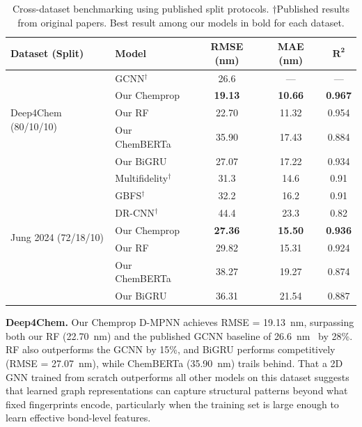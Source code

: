 \documentclass[journal=jcisd8,manuscript=article]{achemso}
\begin{document}
\begin{table}[htbp]
\centering
\caption{Cross-dataset benchmarking using published split protocols. $\dagger$Published results from original papers. Best result among our models in bold for each dataset.}
\label{tab:cross_dataset}
\begin{tabular}{llccc}
\toprule
\textbf{Dataset (Split)} & \textbf{Model} & \textbf{RMSE (nm)} & \textbf{MAE (nm)} & $\boldsymbol{R^2}$ \\
\midrule
\multirow{5}{*}{Deep4Chem (80/10/10)}
  & GCNN$^\dagger$            & 26.6   & ---    & ---   \\
  & Our Chemprop              & \textbf{19.13}  & \textbf{10.66}  & \textbf{0.967} \\
  & Our RF                    & 22.70  & 11.32  & 0.954 \\
  & Our ChemBERTa             & 35.90  & 17.43  & 0.884 \\
  & Our BiGRU                 & 27.07  & 17.22  & 0.934 \\
\midrule
\multirow{7}{*}{Jung 2024 (72/18/10)}
  & Multifidelity$^\dagger$   & 31.3   & 14.6   & 0.91  \\
  & GBFS$^\dagger$            & 32.2   & 16.2   & 0.91  \\
  & DR-CNN$^\dagger$          & 44.4   & 23.3   & 0.82  \\
  & Our Chemprop              & \textbf{27.36}  & \textbf{15.50}  & \textbf{0.936} \\
  & Our RF                    & 29.82  & 15.31  & 0.924 \\
  & Our ChemBERTa             & 38.27  & 19.27  & 0.874 \\
  & Our BiGRU                 & 36.31  & 21.54  & 0.887 \\
\bottomrule
\end{tabular}
\end{table}

\textbf{Deep4Chem.}
Our Chemprop D-MPNN achieves RMSE = 19.13~nm, surpassing both our RF (22.70~nm) and the published GCNN baseline of 26.6~nm~\cite{joung2021deep} by 28\%.
RF also outperforms the GCNN by 15\%, and BiGRU performs competitively (RMSE = 27.07~nm), while ChemBERTa (35.90~nm) trails behind.
That a 2D GNN trained from scratch outperforms all other models on this dataset suggests that learned graph representations can capture structural patterns beyond what fixed fingerprints encode, particularly when the training set is large enough to learn effective bond-level features.
\end{document}
